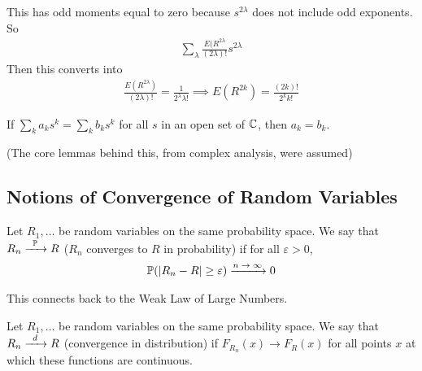 \begin{enumerate}
\begin{solution}
        This has odd moments equal to zero because $s^{2\lambda}$ does not include odd exponents. So
        \begin{align}
            \sum_\lambda \frac{E(R^{2\lambda}}{(2\lambda)!}s^{2\lambda}
        \end{align}
        Then this converts into
        \begin{align}
            \frac{E(R^{2\lambda})}{(2\lambda)!} = \frac{1}{2^\lambda \lambda!} \implies \boxed{E(R^{2k}) = \frac{(2k)!}{2^{k}k!}}
        \end{align}
    \end{solution}
    \begin{aside}
        If $\sum_k a_k s^k = \sum_k b_k s^k$ for all $s$ in an open set of $\mathbb{C}$, then $a_k = b_k$.
    \end{aside}
    (The core lemmas behind this, from complex analysis, were assumed)
\end{enumerate}

\subsection{Notions of Convergence of Random Variables}
\begin{definition}
    Let $R_1, \ldots$ be random variables on the same probability space. We say that $R_n \ce{->[$\probability$]} R$ ($R_n$ converges to $R$ in probability) if for all $\varepsilon > 0$,
    \begin{align}
        \probability(\abs{R_n - R} \ge \varepsilon) \ce{->[$n \to \infty$]} 0
    \end{align}
\end{definition}
This connects back to the Weak Law of Large Numbers.
\begin{definition}
    Let $R_1, \ldots$ be random variables on the same probability space. We say that $R_n \ce{->[$d$]} R$ (convergence in distribution) if $F_{R_n}(x) \to F_R(x)$ for all points $x$ at which these functions are continuous.
\end{definition}

